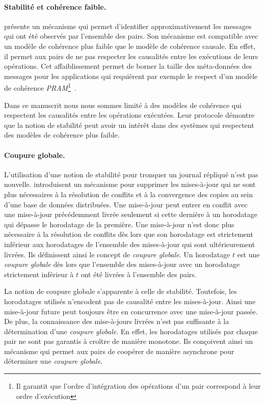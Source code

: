 \paragraph{Stabilité et cohérence faible.} \textcite{golding_1992_ackvector} présente un mécanisme qui permet d'identifier approximativement les messages qui ont été observés par l'ensemble des pairs.
Son mécanisme est compatible avec un modèle de cohérence plus faible que le modèle de cohérence causale.
En effet, il permet aux pairs de ne pas respecter les causalités entre les exécutions de leurs opérations.
Cet affaiblissement permet de borner la taille des méta-données des messages pour les applications qui requiérent par exemple le respect d'un modèle de cohérence \emph{PRAM}\footnote{Il garantit que l'ordre d'intégration des opérations d'un pair correspond à leur ordre d'exécution}~\autocite{viotti_consistency_2016}.

Dans ce manuscrit nous nous sommes limité à des modèles de cohérence qui respectent les causalités entre les opérations exécutées.
Leur protocole démontre que la notion de stabilité peut avoir un intérêt dans des systèmes qui respectent des modèles de cohérence plus faible.

\paragraph{Coupure globale.} L'utilisation d'une notion de stabilité pour tronquer un journal répliqué n'est pas nouvelle.
\textcite{sarin_1987_discarding} introduisent un mécanisme pour supprimer les mises-à-jour qui ne sont plus nécessaires à la résolution de conflits et à la convergence des copies au sein d'une base de données distribuées.
Une mise-à-jour peut entrer en conflit avec une mise-à-jour précédemment livrée seulement si cette dernière à un horodatage qui dépasse le horodatage de la première.
Une mise-à-jour n'est donc plus nécessaire à la résolution de conflits dès lors que son horodatage est strictement inférieur aux horodatages de l'ensemble des mises-à-jour qui sont ultérieurement livrées.
Ils définissent ainsi le concept de \emph{coupure globale}.
Un horodatage $t$ est une \emph{coupure globale} dès lors que l'ensemble des mises-à-jour avec un horodatage strictement inférieur à $t$ ont été livrées à l'ensemble des pairs.

\clearpage

La notion de coupure globale s'apparente à celle de stabilité.
Toutefois, les horodatages utilisés n'encodent pas de causalité entre les mises-à-jour.
Ainsi une mise-à-jour future peut toujours être en concurrence avec une mise-à-jour passée.
De plus, la connaissance des mise-à-jours livrées n'est pas suffisante à la détermination d'une \emph{coupure globale}.
En effet, les horodatages utilisés par chaque pair ne sont pas garantis à croître de manière monotone.
Ils conçoivent ainsi un mécanisme qui permet aux pairs de coopérer de manière asynchrone pour déterminer une \emph{coupure globale}.


